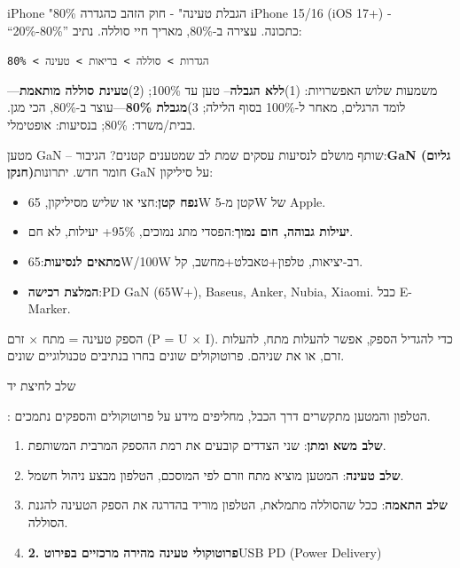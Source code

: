 \begin{tcbinfo}{iPhone "80\% הגבלת טעינה" - חוק הזהב כהגדרה}
iPhone 15/16 (iOS 17+) - “20\%-80\%” כתכונה. עצירה ב-80\%, מאריך חיי סוללה. נתיב:

\texttt{הגדרות > סוללה > בריאות > טעינה > 80\%}

משמעות שלוש האפשרויות: (1)\textbf{ללא הגבלה}– טען עד 100\%; (2)\textbf{טעינת סוללה מותאמת}—לומד הרגלים, מאחר ל-100\% בסוף הלילה; 3)\textbf{מגבלת 80\%}—עוצר ב-80\%, הכי מגן. בבית/משרד: 80\%; בנסיעות: אופטימלי.

\end{tcbinfo}

\begin{tcbinfo}{מטען GaN – שותף מושלם לנסיעות עסקים}
שמת לב שמטענים קטנים? הגיבור:\textbf{GaN (גליום חנקן)}חומר חדש. יתרונות GaN על סיליקון:

\begin{itemize}
  \item \textbf{נפח קטן}:חצי או שליש מסיליקון, 65W קטן מ-5W של Apple.
  \item \textbf{יעילות גבוהה, חום נמוך}:הפסדי מתג נמוכים, 95\%+ יעילות, לא חם.
  \item \textbf{מתאים לנסיעות}:65W/100W רב-יציאות, טלפון+טאבלט+מחשב, קל.
  \item \textbf{המלצת רכישה}:PD GaN (65W+), Baseus, Anker, Nubia, Xiaomi. כבל E-Marker.
\end{itemize}

\end{tcbinfo}


הספק טעינה = מתח × זרם (P = U × I). כדי להגדיל הספק, אפשר להעלות מתח, להעלות זרם, או את שניהם. פרוטוקולים שונים בחרו בנתיבים טכנולוגיים שונים.


שלב לחיצת יד

: הטלפון והמטען מתקשרים דרך הכבל, מחליפים מידע על פרוטוקולים והספקים נתמכים.

\begin{enumerate}
  \item \textbf{שלב משא ומתן}: שני הצדדים קובעים את רמת ההספק המרבית המשותפת.
  \item \textbf{שלב טעינה}: המטען מוציא מתח וזרם לפי המוסכם, הטלפון מבצע ניהול חשמל.
  \item \textbf{שלב התאמה}: ככל שהסוללה מתמלאת, הטלפון מוריד בהדרגה את הספק הטעינה להגנת הסוללה.
  \item \textbf{2. פרוטוקולי טעינה מהירה מרכזיים בפירוט}USB PD (Power Delivery)
\end{enumerate}

